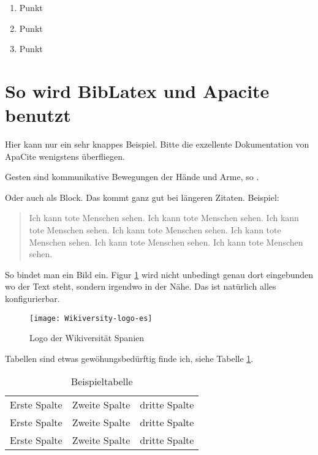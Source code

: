 \begin{enumerate}
\item Punkt
\item Punkt
\item Punkt
\end{enumerate}

\section{So wird BibLatex und Apacite benutzt}

Hier kann nur ein sehr knappes Beispiel.
Bitte die exzellente Dokumentation von ApaCite wenigstens überfliegen.

\glqq{}Gesten sind kommunikative Bewegungen der Hände und Arme\grqq{}, so \Textcite[13]{Muller.1998}.

Oder auch als Block. Das kommt ganz gut bei längeren Zitaten. Beispiel:

\begin{quote}
\glqq{}Ich kann tote Menschen sehen. Ich kann tote Menschen sehen. Ich kann tote Menschen sehen. Ich kann tote Menschen sehen. Ich kann tote Menschen sehen. Ich kann tote Menschen sehen. Ich kann tote Menschen sehen.\grqq{} \Parencites[1]{Muller.1998}[17]{Muller.1998}
\end{quote}


So bindet man ein Bild ein.
Figur \ref{img_wikiversidad} wird nicht unbedingt genau dort eingebunden wo der Text steht, sondern irgendwo in der Nähe.
Das ist natürlich alles konfigurierbar.

\begin{figure}
\begin{center}
  \texttt{[image: Wikiversity-logo-es]}
\end{center}
\caption{Logo der Wikiversität Spanien \parencite[23]{Muller.1998}}
\label{img_wikiversidad}
\end{figure}


Tabellen sind etwas gewöhungsbedürftig finde ich, siehe Tabelle \ref{tab_beispiel1}.

\begin{table}[h]
\begin{center}
\begin{tabular}{lll}
Erste Spalte & Zweite Spalte & dritte Spalte \\
Erste Spalte & Zweite Spalte & dritte Spalte \\
Erste Spalte & Zweite Spalte & dritte Spalte \\
\end{tabular}
\end{center}
\caption{Beispieltabelle \parencite[nach][2]{Muller.1998}}
\label{tab_beispiel1}
\end{table}

